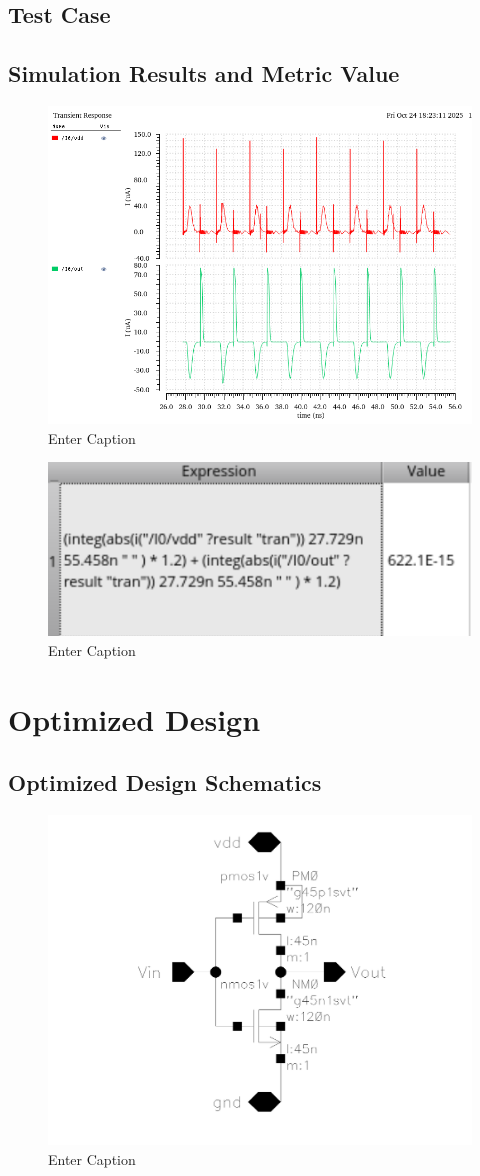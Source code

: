 \documentclass[12pt]{article}
\begin{document}
\newpage

\subsection{Test Case}



\newpage

\subsection{Simulation Results and Metric Value}
\begin{figure}[H]
    \centering
    \includegraphics[width=0.5\linewidth]{writeup//figures/baseline_energy_currents.png}
    \caption{Enter Caption}
\end{figure}

\begin{figure}[H]
    \centering
    \includegraphics[width=0.5\linewidth]{writeup//figures/baseline_energy_val.png}
    \caption{Enter Caption}
\end{figure}

\newpage

\section{Optimized Design}
\subsection{Optimized Design Schematics}
\begin{figure}[H]
    \centering
    \includegraphics[width=0.5\linewidth]{writeup//figures/inv_sch.png}
    \caption{Enter Caption}
\end{figure}
\end{document}
